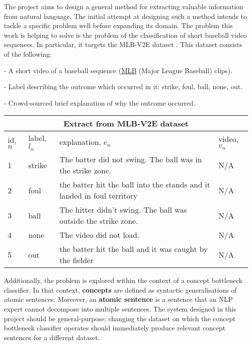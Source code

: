 The project aims to design a general method for extracting valuable information from natural language.
The initial attempt at designing such a method intends to tackle a specific problem well before expanding its domain.
The problem this work is helping to solve is the problem of the classification of short baseball video sequences.
In particular, it targets the MLB-V2E dataset  \cite{RefWorks:RefID:16-2021automatic}.
This dataset consists of the following:

 - A short video of a baseball sequence (\href{www.mlb.com}{MLB} (Major League Baseball) clips).
 
 - Label describing the outcome which occurred in it: strike, foul, ball, none, out.

 - Crowd-sourced brief explanation of why the outcome occurred.
 
 
\begin{center}
\begin{tabular}{ |p{1.5cm}|p{1.5cm}|p{9cm}|p{1.7cm}|  }
 \hline
 \multicolumn{4}{|c|}{Extract from MLB-V2E dataset} \\
 \hline
 id, $n$ & label, $l_n$ & explanation, $e_n$& video, $v_n$\\
 \hline
 1 & strike & The batter did not swing. The ball was in the strike zone. & N/A \\
 2 & foul & the batter hit the ball into the stands and it landed in foul territory & N/A \\
 3 & ball & The hitter didn’t swing. The ball was outside the strike zone. & N/A \\
 4 & none & The video did not load. & N/A \\
 5 & out & the batter hit the ball and it was caught by the fielder & N/A \\
 
 \hline
\end{tabular}
\end{center}


Additionally, the problem is explored within the context of a concept bottleneck classifier. 
In that context, \textbf{concepts} are defined as syntactic generalisations of atomic sentences. 
Moreover, an \textbf{atomic sentence} is a sentence that an NLP expert cannot decompose into multiple sentences.
The system designed in this project should be general-purpose; changing the dataset on which the concept bottleneck classifier operates should immediately produce relevant concept sentences for a different dataset.

